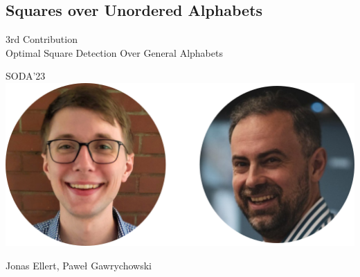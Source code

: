 
\subsection{Squares over Unordered Alphabets}
\newcommand{\absolute}[1]{\left\lvert#1\right\rvert}
\newcommand{\orderof}[1]{\mathcal{O}(#1)}

\begin{frame}
    \centering
    {\large 3rd Contribution}\\
    \medskip
    {\Large Optimal Square Detection  Over General Alphabets}
  
    \bigskip
    {\large SODA'23}\\
    \bigskip
    \includegraphics{pictures/mindmap/squares.png}
  
    \bigskip
    Jonas Ellert, Paweł Gawrychowski
\end{frame}




